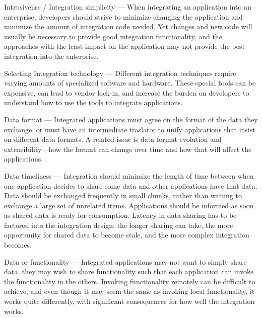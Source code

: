 \documentclass[Screen16to9,17pt]{foils}
\begin{document}

Intrusivenss / Integration simplicity — When integrating an application into an enterprise, developers should strive to minimize changing the application and minimize the amount of integration code needed. Yet changes and new code will usually be necessary to provide good integration functionality, and the approaches with the least impact on the application may not provide the best integration into the enterprise.


Selecting Integration technology — Different integration techniques require varying amounts of specialized software and hardware. These special tools can be expensive, can lead to vendor lock-in, and increase the burden on developers to understand how to use the tools to integrate applications.


Data format — Integrated applications must agree on the format of the data they exchange, or must have an intermediate traslator to unify applications that insist on different data formats. A related issue is data format evolution and extensibility—how the format can change over time and how that will affect the applications.


Data timeliness — Integration should minimize the length of time between when one application decides to share some data and other applications have that data. Data should be exchanged frequently in small chunks, rather than waiting to exchange a large set of unrelated items. Applications should be informed as soon as shared data is ready for consumption. Latency in data sharing has to be factored into the integration design; the longer sharing can take, the more opportunity for shared data to become stale, and the more complex integration becomes.


Data or functionality — Integrated applications may not want to simply share data, they may wish to share functionality such that each application can invoke the functionality in the others. Invoking functionality remotely can be difficult to achieve, and even though it may seem the same as invoking local functionality, it works quite differently, with significant consequences for how well the integration works.

\end{document}
